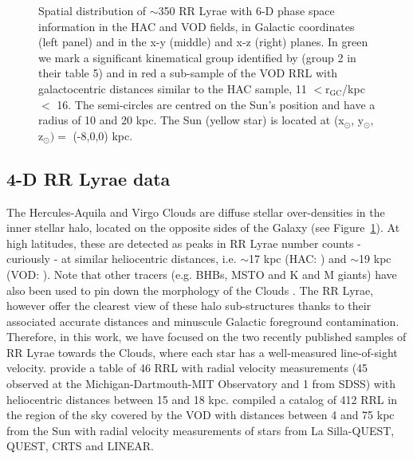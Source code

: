 \documentclass[fleqn,usenatbib]{mnras}
\begin{document}
\begin{figure}
	\vspace{-0.55cm}
    \caption{Spatial distribution of $\sim$350 RR Lyrae with 6-D phase
      space information in the HAC and VOD fields, in Galactic
      coordinates (left panel) and in the x-y (middle) and x-z (right)
      planes. In green we mark a significant kinematical group
      identified by \citet{Vivas2016} (group 2 in their table 5) and
      in red a sub-sample of the VOD RRL with galactocentric distances
      similar to the HAC sample, 11 $<\mathrm{r_{GC}}$/kpc$<$
      16. The semi-circles are centred on the Sun's position and have
      a radius of 10 and 20 kpc. The Sun (yellow star) is located at
      (x$_{\odot}$, y$_{\odot}$, z$_{\odot})= $ (-8,0,0) kpc.}
    \label{fig:lb}
\end{figure}
%
\subsection{4-D RR Lyrae data}
%
The Hercules-Aquila and Virgo Clouds are diffuse stellar
over-densities in the inner stellar halo, located on the opposite
sides of the Galaxy (see Figure~\ref{fig:lb}). At high latitudes,
these are detected as peaks in RR Lyrae number counts - curiously - at
similar heliocentric distances, i.e. $\sim$17 kpc (HAC:
\citealt{Wa09,Simion2014}) and $\sim$19 kpc (VOD: \citealt{Vivas2006,
  Duffau2014, Vivas2016}). Note that other tracers (e.g. BHBs, MSTO
and K and M giants) have also been used to pin down the morphology of
the Clouds \citep[see
  e.g.][]{Be07,Juric2008,Sharma2010,Bonaca2012,Conroy2018}. The RR
Lyrae, however offer the clearest view of these halo sub-structures
thanks to their associated accurate distances and minuscule Galactic
foreground contamination. Therefore, in this work, we have focused on
the two recently published samples of RR Lyrae towards the Clouds,
where each star has a well-measured line-of-sight
velocity. \citet{Simion2018} provide a table of 46 RRL with radial
velocity measurements (45 observed at the Michigan-Dartmouth-MIT
Observatory and 1 from SDSS) with heliocentric distances between 15
and 18 kpc. \cite{Vivas2016} compiled a catalog of 412 RRL in the
region of the sky covered by the VOD with distances between 4 and 75
kpc from the Sun with radial velocity measurements of stars from La
Silla-QUEST, QUEST, CRTS and LINEAR.

%
\end{document}
